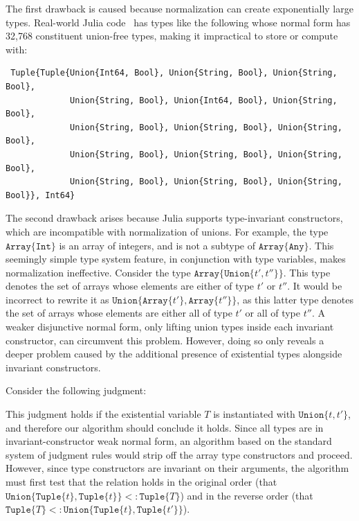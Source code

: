\documentclass[a4paper,english]{lipics-v2019}
\newcommand{\xt}[1]{\texttt{#1}}
\newcommand{\union}[2]{\xt{Union\{}#1,#2\xt{\}}}
\newcommand{\tuple}[1]{\xt{Tuple\{}#1\xt{\}}}
\newcommand{\arrayt}[1]{\xt{Array\{}#1\xt{\}}}
\begin{document}
The first drawback is caused because normalization can create exponentially
large types. Real-world Julia code~\cite{DBLP:NardelliBPCBV18} has types like the
following whose normal form has 32,768
constituent union-free types, making it impractical to store or compute with:

\vspace{-2mm}
\begin{small}
\begin{verbatim}
 Tuple{Tuple{Union{Int64, Bool}, Union{String, Bool}, Union{String, Bool}, 
             Union{String, Bool}, Union{Int64, Bool}, Union{String, Bool}, 
             Union{String, Bool}, Union{String, Bool}, Union{String, Bool}, 
             Union{String, Bool}, Union{String, Bool}, Union{String, Bool}, 
             Union{String, Bool}, Union{String, Bool}, Union{String, Bool}}, Int64}
\end{verbatim}
\end{small}
\vspace{-2mm}

The second drawback arises because Julia supports type-invariant
constructors, which are incompatible with normalization of unions. For example,
the type $\arrayt{\xt{Int}}$ is an array of integers, and is not a
subtype of $\arrayt{\xt{Any}}$. This seemingly simple type system feature, in
conjunction with type variables, makes normalization ineffective.  Consider
the type {\small \(\arrayt{\union{t'}{t''}}\)}. This type denotes the set of
arrays whose elements are either of type {\small $t'$} or {\small $t''$}.
It would be incorrect to rewrite it as {\small
  \(\union{\arrayt{t'}}{\arrayt{t''}}\)}, as this latter type denotes the
set of arrays whose elements are either all of type {\small $t'$} or all of
type {\small$t''$}. A weaker disjunctive normal form, only lifting union
types inside each invariant constructor, can circumvent this
problem. However, doing so only reveals a deeper problem caused by the additional presence
of existential types alongside invariant constructors. 

Consider the following judgment:

%
\vspace{-4mm}{\small\[
  \arrayt{\union{\tuple{t}}{\tuple{t'}}} \ \ <:\ \ \exists T\,.\, \arrayt{\tuple{T}}
\]}\vspace{-4mm}
%

\noindent  This judgment holds if the existential variable {\small$T$} is instantiated with
{\small $\union{t}{t'}$}, and therefore our algorithm should conclude it
holds. Since all types are in invariant-constructor weak normal form, an algorithm based on the
standard system of judgment rules would strip off the array type constructors
and proceed.  However, since type constructors are invariant on their
arguments, the algorithm must first test that the relation holds in the original order
(that {\small$\union{\tuple{t}}{\tuple{t}}<:\tuple{T}$}) and in the
reverse order (that {\small$\tuple{T}<:\union{\tuple{t}}{\tuple{t'}}$}).
\end{document}
